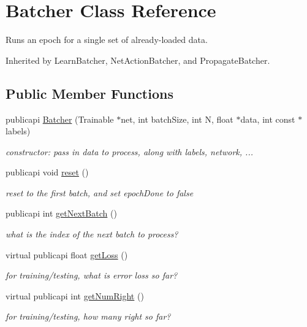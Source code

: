 \hypertarget{classBatcher}{\section{Batcher Class Reference}
\label{classBatcher}
}


Runs an epoch for a single set of already-\/loaded data.  




Inherited by Learn\-Batcher, Net\-Action\-Batcher, and Propagate\-Batcher.

\subsection*{Public Member Functions}
\begin{DoxyCompactItemize}
\item 
publicapi \hyperlink{classBatcher_a4a53928e1ea4f752953ea43ab7faa0e8}{Batcher} (Trainable $\ast$net, int batch\-Size, int N, float $\ast$data, int const $\ast$labels)
\begin{DoxyCompactList}\small\item\em constructor\-: pass in data to process, along with labels, network, ... \end{DoxyCompactList}\item 
publicapi void \hyperlink{classBatcher_a0f3c13ade8b4840d87a43167a7341070}{reset} ()
\begin{DoxyCompactList}\small\item\em reset to the first batch, and set epoch\-Done to false \end{DoxyCompactList}\item 
publicapi int \hyperlink{classBatcher_ab26dca3a4d002664f0a13c68ddc65ced}{get\-Next\-Batch} ()
\begin{DoxyCompactList}\small\item\em what is the index of the next batch to process? \end{DoxyCompactList}\item 
virtual publicapi float \hyperlink{classBatcher_afaafa92c67a361127079ba8b3003e0f2}{get\-Loss} ()
\begin{DoxyCompactList}\small\item\em for training/testing, what is error loss so far? \end{DoxyCompactList}\item 
virtual publicapi int \hyperlink{classBatcher_a5426a711b8a6989f57fa1c6dad2e1138}{get\-Num\-Right} ()
\begin{DoxyCompactList}\small\item\em for training/testing, how many right so far? \end{DoxyCompactList}\item 

\end{DoxyCompactItemize}
